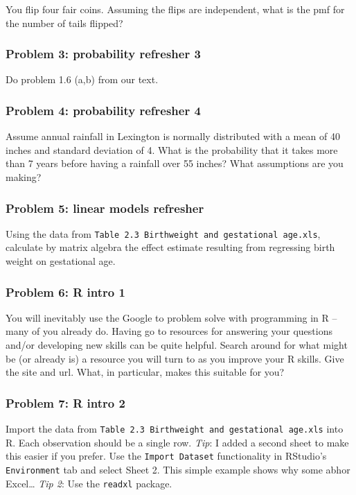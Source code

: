 \documentclass[]{article}
\begin{document}
You flip four fair coins. Assuming the flips are independent, what is
the pmf for the number of tails flipped?

\subsubsection{Problem 3: probability refresher
3}\label{problem-3-probability-refresher-3}

Do problem 1.6 (a,b) from our text.

\subsubsection{Problem 4: probability refresher
4}\label{problem-4-probability-refresher-4}

Assume annual rainfall in Lexington is normally distributed with a mean
of 40 inches and standard deviation of 4. What is the probability that
it takes more than 7 years before having a rainfall over 55 inches? What
assumptions are you making?

\subsubsection{Problem 5: linear models
refresher}\label{problem-5-linear-models-refresher}

Using the data from
\texttt{Table\ 2.3\ Birthweight\ and\ gestational\ age.xls}, calculate
by matrix algebra the effect estimate resulting from regressing birth
weight on gestational age.

\subsubsection{Problem 6: R intro 1}\label{problem-6-r-intro-1}

You will inevitably use the Google to problem solve with programming in
R -- many of you already do. Having go to resources for answering your
questions and/or developing new skills can be quite helpful. Search
around for what might be (or already is) a resource you will turn to as
you improve your R skills. Give the site and url. What, in particular,
makes this suitable for you?

\subsubsection{Problem 7: R intro 2}\label{problem-7-r-intro-2}

Import the data from
\texttt{Table\ 2.3\ Birthweight\ and\ gestational\ age.xls} into R. Each
observation should be a single row. \emph{Tip}: I added a second sheet
to make this easier if you prefer. Use the \texttt{Import\ Dataset}
functionality in RStudio's \texttt{Environment} tab and select Sheet 2.
This simple example shows why some abhor Excel\ldots{} \emph{Tip 2}: Use
the \texttt{readxl} package.
\end{document}
